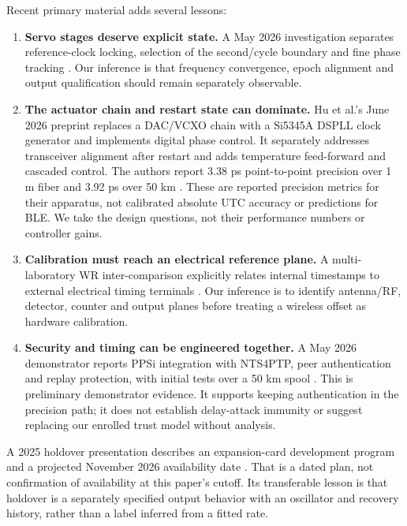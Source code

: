 \documentclass[11pt,letterpaper]{article}
\begin{document}
Recent primary material adds several lessons:
\begin{enumerate}
\item \textbf{Servo stages deserve explicit state.} A May 2026 investigation separates reference-clock locking, selection of the second/cycle boundary and fine phase tracking \cite{servo2026}. Our inference is that frequency convergence, epoch alignment and output qualification should remain separately observable.
\item \textbf{The actuator chain and restart state can dominate.} Hu et al.'s June 2026 preprint replaces a DAC/VCXO chain with a Si5345A DSPLL clock generator and implements digital phase control. It separately addresses transceiver alignment after restart and adds temperature feed-forward and cascaded control. The authors report 3.38 ps point-to-point precision over 1 m fiber and 3.92 ps over 50 km \cite{cepc}. These are reported precision metrics for their apparatus, not calibrated absolute UTC accuracy or predictions for BLE. We take the design questions, not their performance numbers or controller gains.
\item \textbf{Calibration must reach an electrical reference plane.} A multi-laboratory WR inter-comparison explicitly relates internal timestamps to external electrical timing terminals \cite{electrical}. Our inference is to identify antenna/RF, detector, counter and output planes before treating a wireless offset as hardware calibration.
\item \textbf{Security and timing can be engineered together.} A May 2026 demonstrator reports PPSi integration with NTS4PTP, peer authentication and replay protection, with initial tests over a 50 km spool \cite{security2026}. This is preliminary demonstrator evidence. It supports keeping authentication in the precision path; it does not establish delay-attack immunity or suggest replacing our enrolled trust model without analysis.
\end{enumerate}

A 2025 holdover presentation describes an expansion-card development program and a projected November 2026 availability date \cite{holdover2025}. That is a dated plan, not confirmation of availability at this paper's cutoff. Its transferable lesson is that holdover is a separately specified output behavior with an oscillator and recovery history, rather than a label inferred from a fitted rate.
\end{document}
